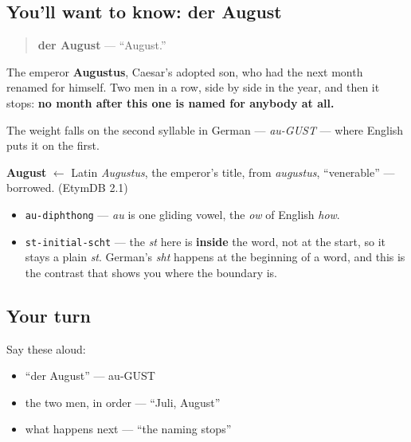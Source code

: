 \subsection*{You'll want to know: der August}
\begin{quote}
\textbf{der August} — \textquotedblleft{}August.\textquotedblright{}
\end{quote}

The emperor \textbf{Augustus}, Caesar's adopted son, who had the next month renamed for himself. Two men in a row, side by side in the year, and then it stops: \textbf{no month after this one is named for anybody at all.}

The weight falls on the second syllable in German — \emph{au-GUST} — where English puts it on the first.

\begin{cousinweb}
\textbf{August} $\leftarrow$ Latin \emph{Augustus}, the emperor's title, from \emph{augustus}, \textquotedblleft{}venerable\textquotedblright{} — borrowed. (EtymDB 2.1)
\end{cousinweb}

\begin{sounds}
\begin{itemize}
\raggedright
  \item \texttt{au-diphthong} — \emph{au} is one gliding vowel, the \emph{ow} of English \emph{how}.
  \item \texttt{st-initial-scht} — the \emph{st} here is \textbf{inside} the word, not at the start, so it stays a plain \emph{st}. German's \emph{sht} happens at the beginning of a word, and this is the contrast that shows you where the boundary is.
\end{itemize}
\end{sounds}

\subsection*{Your turn}
Say these aloud:

\begin{itemize}
\raggedright
  \item \textquotedblleft{}der August\textquotedblright{} — au-GUST
  \item the two men, in order — \textquotedblleft{}Juli, August\textquotedblright{}
  \item what happens next — \textquotedblleft{}the naming stops\textquotedblright{}
\end{itemize}

